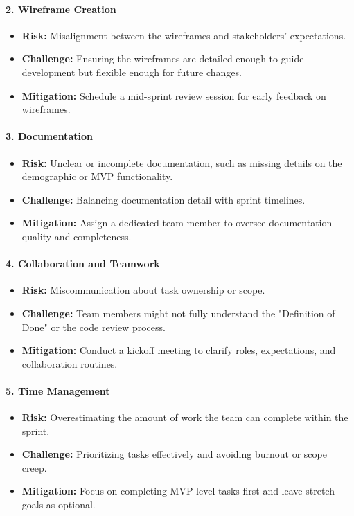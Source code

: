 \begin{enumerate}
\paragraph{2. \textbf{Wireframe Creation}}
\begin{itemize}
    \item \textbf{Risk:} Misalignment between the wireframes and stakeholders' expectations.
    \item \textbf{Challenge:} Ensuring the wireframes are detailed enough to guide development but flexible enough for future changes.
    \item \textbf{Mitigation:} Schedule a mid-sprint review session for early feedback on wireframes.
\end{itemize}

\paragraph{3. \textbf{Documentation}}
\begin{itemize}
    \item \textbf{Risk:} Unclear or incomplete documentation, such as missing details on the demographic or MVP functionality.
    \item \textbf{Challenge:} Balancing documentation detail with sprint timelines.
    \item \textbf{Mitigation:} Assign a dedicated team member to oversee documentation quality and completeness.
\end{itemize}

\paragraph{4. \textbf{Collaboration and Teamwork}}
\begin{itemize}
    \item \textbf{Risk:} Miscommunication about task ownership or scope.
    \item \textbf{Challenge:} Team members might not fully understand the "Definition of Done" or the code review process.
    \item \textbf{Mitigation:} Conduct a kickoff meeting to clarify roles, expectations, and collaboration routines.
\end{itemize}

\paragraph{5. \textbf{Time Management}}
\begin{itemize}
    \item \textbf{Risk:} Overestimating the amount of work the team can complete within the sprint.
    \item \textbf{Challenge:} Prioritizing tasks effectively and avoiding burnout or scope creep.
    \item \textbf{Mitigation:} Focus on completing MVP-level tasks first and leave stretch goals as optional.
\end{itemize}


\end{enumerate}
